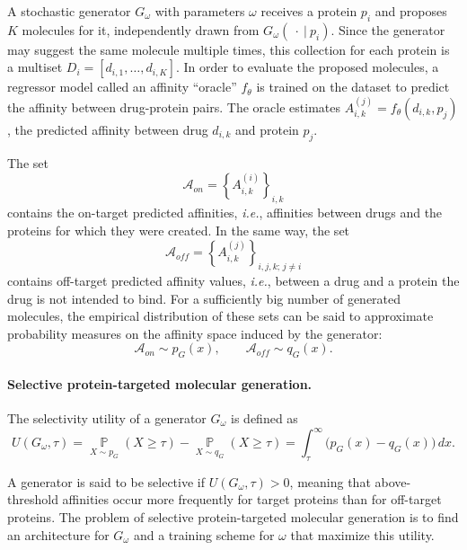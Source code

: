 \documentclass[a4paper,12pt]{article}
\begin{document}
A stochastic generator $G_\omega$ with parameters $\omega$ receives a protein $p_i$ and proposes $K$ molecules for it, independently drawn from $G_\omega(\ \cdot\ |\ p_i)$. Since the generator may suggest the same molecule multiple times, this collection for each protein is a multiset $D_i=[d_{i,1},\ldots,d_{i,K}]$. In order to evaluate the proposed molecules, a regressor model called an affinity ``oracle'' $f_\theta$ is trained on the dataset to predict the affinity between drug-protein pairs. The oracle estimates
$A_{i,k}^{(j)}=f_\theta(d_{i,k},p_j)$, the predicted affinity between drug $d_{i,k}$ and protein $p_j$.

The set
\begin{equation*}
    \mathcal{A}_{on}=\left\{ A_{i,k}^{(i)} \right\}_{i,k}
\end{equation*}
contains the on-target predicted affinities, \emph{i.e.}, affinities between drugs and the proteins for which they were created. In the same way, the set
\begin{equation*}
    \mathcal{A}_{off}=\left\{ A_{i,k}^{(j)}\right\}_{i,j,k;\, j \neq i}
\end{equation*}
contains off-target predicted affinity values, \emph{i.e.}, between a drug and a protein the drug is not intended to bind. For a sufficiently big number of generated molecules, the empirical distribution of these sets can be said to approximate probability measures on the affinity space induced by the generator:
\begin{equation*}
    \mathcal{A}_{on} \sim p_G(x), \qquad\mathcal{A}_{off} \sim q_G(x).
\end{equation*}

\paragraph{Selective protein-targeted molecular generation.}

The selectivity utility of a generator $G_\omega$ is defined as
\begin{equation*}
    U(G_\omega, \tau)
    =
    \mathop{\mathbb P}\limits_{X\sim p_G}(X\geq\tau)
    -
    \mathop{\mathbb P}\limits_{X\sim q_G}(X\geq\tau)
    =
    \int_\tau^\infty
    \bigl(p_G(x)-q_G(x)\bigr)\,dx.
\end{equation*}

A generator is said to be selective if $U(G_\omega, \tau)>0$, meaning that
above-threshold affinities occur more frequently for target proteins
than for off-target proteins. The problem of selective protein-targeted
molecular generation is to find an architecture for $G_\omega$ and a
training scheme for $\omega$ that maximize this utility.
\end{document}
